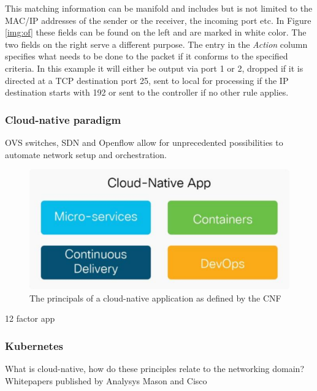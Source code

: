 This matching information can be manifold and includes but is not limited to the MAC/IP addresses of the sender or the receiver, the incoming port etc. In Figure \ref{img:of} these fields can be found on the left and are marked in white color. The two fields on the right serve a different purpose. The entry in the \textit{Action} column specifies what needs to be done to the packet if it conforms to the specified criteria. In this example it will either be output via port 1 or 2, dropped if it is directed at a TCP destination port 25, sent to local for processing if the IP destination starts with 192 or sent to the controller if no other rule applies. 

\subsubsection{Cloud-native paradigm}
OVS switches, SDN and Openflow allow for unprecedented possibilities to automate network setup and orchestration. 
\begin{figure}[h]
	\centering
	\includegraphics[width=0.75\linewidth]{images/cloudNativeApp.png}
	\caption{The principals of a cloud-native application as defined by the CNF \cite{CNF}}
	\label{img:cloudNativeApp}
\end{figure}

12 factor app


\subsubsection{Kubernetes}



What is cloud-native, how do these principles relate to  the networking domain? Whitepapers published by Analysys Mason \cite{evolutionnfv} and Cisco \cite{CNF}



